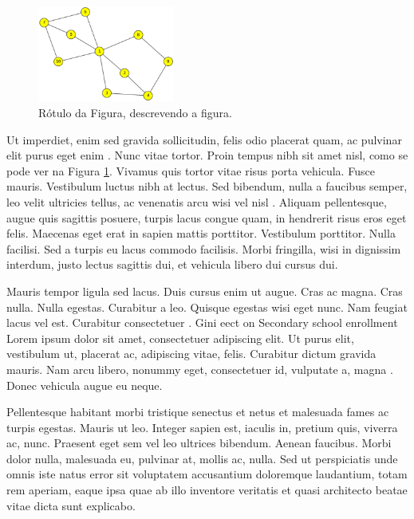 \begin{figure}[!ht]
	\centering
	\includegraphics[width=0.4\textwidth]{img/artigo1.eps}   
	\caption{Rótulo da Figura, descrevendo a figura.}
	\label{fig:figura1}
\end{figure}

Ut imperdiet, enim sed gravida sollicitudin, felis odio placerat quam, ac pulvinar elit purus eget enim \cite{Gubitoso1992}. Nunc vitae tortor. Proin tempus nibh sit amet nisl, como se pode ver na Figura \ref{fig:figura1}. Vivamus quis tortor vitae risus porta vehicula. Fusce mauris. Vestibulum luctus nibh at lectus. Sed bibendum, nulla a faucibus semper, leo velit ultricies tellus, ac venenatis arcu wisi vel nisl \cite{icse2015}. Aliquam pellentesque, augue quis sagittis posuere, turpis lacus congue quam, in hendrerit risus eros eget felis. Maecenas eget erat in sapien mattis porttitor\footnotemark. Vestibulum porttitor. Nulla facilisi. Sed a turpis eu lacus commodo facilisis. Morbi fringilla, wisi in dignissim interdum, justo lectus sagittis dui, et vehicula libero dui cursus dui.


Mauris tempor ligula sed lacus. Duis cursus enim ut augue. Cras ac magna. Cras nulla. Nulla egestas. Curabitur a leo. Quisque egestas wisi eget nunc. Nam feugiat lacus vel est. Curabitur consectetuer \cite{Araujo2015}. Gini eect on Secondary school enrollment Lorem ipsum dolor sit amet, consectetuer adipiscing elit. Ut purus elit, vestibulum ut, placerat ac, adipiscing vitae, felis. Curabitur dictum gravida mauris. Nam arcu libero, nonummy eget, consectetuer id, vulputate a, magna \cite{Folha2015}. Donec vehicula augue eu neque.

Pellentesque habitant morbi tristique senectus et netus et malesuada fames ac turpis egestas. Mauris ut leo. Integer sapien est, iaculis in, pretium quis, viverra ac, nunc. Praesent eget sem vel leo ultrices bibendum. Aenean faucibus. Morbi dolor nulla, malesuada eu, pulvinar at, mollis ac, nulla. Sed ut perspiciatis unde omnis iste natus error sit voluptatem accusantium doloremque laudantium, totam rem aperiam, eaque ipsa quae ab illo inventore veritatis et quasi architecto beatae vitae dicta sunt explicabo.

